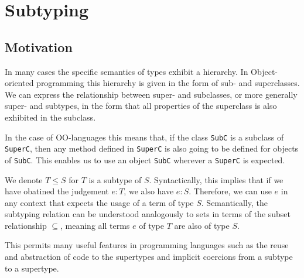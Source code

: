 
\chapter{Subtyping}\label{ch:subtyping}

\section{Motivation}\label{sec:subtypemotivation}

In many cases the specific semantics of types exhibit a hierarchy.
In Object-oriented programming this hierarchy is given in the form of sub- and superclasses.
We can express the relationship between super- and subclasses, or more generally super- and subtypes,
in the form that all properties of the superclass is also exhibited in the subclass. \cite{subtyping}

In the case of OO-languages this means that, if the class \texttt{SubC} is a subclass of \texttt{SuperC},
then any method defined in \texttt{SuperC} is also going to be defined for objects of \texttt{SubC}.
This enables us to use an object \texttt{SubC} wherever a \texttt{SuperC} is expected.

We denote $T \leq S$ for $T$ is a subtype of $S$.
Syntactically, this implies that if we have obatined the judgement $e : T$, we also have $e : S$.
Therefore, we can use $e$ in any context that expects the usage of a term of type $S$.
Semantically, the subtyping relation can be understood analogously to sets in terms of the subset relationship $\subseteq$,
meaning all terms $e$ of type $T$ are also of type $S$.
\cite{reynolds_1998}

This permits many useful features in programming languages such as the reuse and abstraction of code to the supertypes and implicit coercions from a subtype to a supertype.
